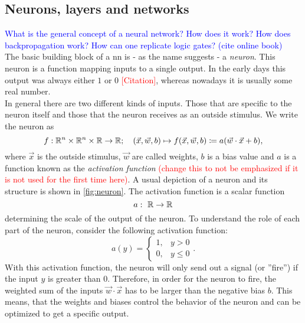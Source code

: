 \subsection{Neurons, layers and networks}\label{sec:basics_neuron_network}
\textcolor{blue}{What is the general concept of a neural network? How does it work? How does backpropagation work? How can one replicate logic gates? (cite online book)}\\
\noindent The basic building block of a \gls{nn} is - as the name suggests - a \emph{neuron}. This neuron is a function mapping inputs to a single output. In the early days this output was always either $1$ or $0$ \textcolor{red}{[Citation]}, whereas nowadays it is usually some real number.\\
In general there are two different kinds of inputs. Those that are specific to the neuron itself and those that the neuron receives as an outside stimulus. We write the neuron as
\begin{equation}\label{def:neuron}
f: \mathbb{R}^n\times\mathbb{R}^n\times\mathbb{R}\to\mathbb{R} ;\ \ \ (\vec{x}, \vec{w}, b)\mapsto f(\vec{x}, \vec{w}, b)\coloneqq a(\vec{w}\cdot\vec{x}+b),
\end{equation}
where $\vec{x}$ is the outside stimulus, $\vec{w}$ are called weights, $b$ is a bias value and $a$ is a function known as the \emph{activation function}\textcolor{red}{ (change this to not be emphasized if it is not used for the first time here)}. A usual depiction of a neuron and its structure is shown in \autoref{fig:neuron}. The activation function is a scalar function
\begin{equation}\label{def:activation_function}
a:\ \mathbb{R}\to\mathbb{R}
\end{equation}
determining the scale of the output of the neuron. To understand the role of each part of the neuron, consider the following activation function:
\begin{equation}\label{def:step_activation}
a(y) = 
\begin{cases}
	1,& y> 0\\
	0,& y\leq 0
\end{cases}.
\end{equation}
With this activation function, the neuron will only send out a signal (or ''fire'') if the input $y$ is greater than 0. Therefore, in order for the neuron to fire, the weighted sum of the inputs $\vec{w}\cdot\vec{x}$ has to be larger than the negative bias $b$. This means, that the weights and biases control the behavior of the neuron and can be optimized to get a specific output.\\
